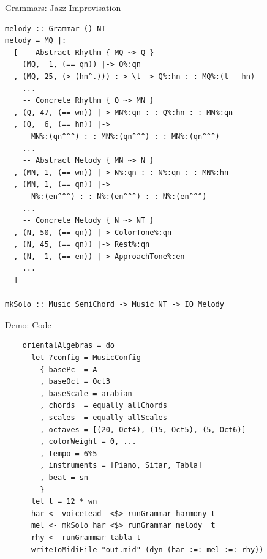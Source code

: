 \documentclass{beamer}
\begin{document}
	\begin{frame}[fragile=singleslide]{Grammars: Jazz Improvisation}
	\begin{verbatim}
melody :: Grammar () NT
melody = MQ |:
  [ -- Abstract Rhythm { MQ ~> Q }
    (MQ,  1, (== qn)) |-> Q%:qn
  , (MQ, 25, (> (hn^.))) :-> \t -> Q%:hn :-: MQ%:(t - hn)
    ...
    -- Concrete Rhythm { Q ~> MN }
  , (Q, 47, (== wn)) |-> MN%:qn :-: Q%:hn :-: MN%:qn
  , (Q,  6, (== hn)) |->
      MN%:(qn^^^) :-: MN%:(qn^^^) :-: MN%:(qn^^^)
    ...
    -- Abstract Melody { MN ~> N }
  , (MN, 1, (== wn)) |-> N%:qn :-: N%:qn :-: MN%:hn
  , (MN, 1, (== qn)) |->
      N%:(en^^^) :-: N%:(en^^^) :-: N%:(en^^^)
    ...
    -- Concrete Melody { N ~> NT }
  , (N, 50, (== qn)) |-> ColorTone%:qn
  , (N, 45, (== qn)) |-> Rest%:qn
  , (N,  1, (== en)) |-> ApproachTone%:en
    ...
  ]

mkSolo :: Music SemiChord -> Music NT -> IO Melody
    \end{verbatim}
	\end{frame}

	\begin{frame}[fragile=singleslide]{Demo: Code}
	\begin{verbatim}
    orientalAlgebras = do
      let ?config = MusicConfig
        { basePc  = A
        , baseOct = Oct3
        , baseScale = arabian
        , chords  = equally allChords
        , scales  = equally allScales
        , octaves = [(20, Oct4), (15, Oct5), (5, Oct6)]
        , colorWeight = 0, ...
        , tempo = 6%5
        , instruments = [Piano, Sitar, Tabla]
        , beat = sn
        }
      let t = 12 * wn
      har <- voiceLead  <$> runGrammar harmony t
      mel <- mkSolo har <$> runGrammar melody  t
      rhy <- runGrammar tabla t
      writeToMidiFile "out.mid" (dyn (har :=: mel :=: rhy))
	\end{verbatim}
  	\end{frame}
\end{document}
